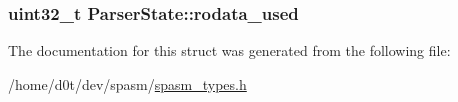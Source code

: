 \hypertarget{struct_parser_state_a610de7682a50d494f840c335b66b88b7}{
\subsubsection[{rodata\-\_\-used}]{\setlength{\rightskip}{0pt plus 5cm}uint32\-\_\-t {\bf \-Parser\-State\-::rodata\-\_\-used}}}\label{struct_parser_state_a610de7682a50d494f840c335b66b88b7}


\-The documentation for this struct was generated from the following file\-:\begin{DoxyCompactItemize}
\item 
/home/d0t/dev/spasm/\hyperlink{spasm__types_8h}{spasm\-\_\-types.\-h}\end{DoxyCompactItemize}
